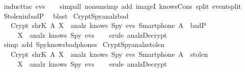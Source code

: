 \begin{isabellebody}
  \ {\isacharparenleft}induct{\isacharunderscore}tac\ {\isachardoublequoteopen}evs{\isachardoublequoteclose}{\isacharparenright}\isanewline
  \ \ \isamarkupfalse%
  \ {\isacharparenleft}simp{\isacharunderscore}all\ {\isacharparenleft}no{\isacharunderscore}asm{\isacharunderscore}simp{\isacharparenright}\ add{\isacharcolon}\ imageI\ knows{\isacharunderscore}Cons\ split{\isacharcolon}\ event{\isachardot}split{\isacharparenright}\isanewline
  \isamarkupfalse%
  \ Stolen{\isacharunderscore}in{\isacharunderscore}badP\ \isamarkupfalse%
  \ blast%
  \endisatagproof
  {\isafoldproof}%
  \isadelimproof
  \isanewline
  \endisadelimproof
  \isanewline
  \isanewline
  \isamarkupfalse%
  \ Crypt{\isacharunderscore}Spy{\isacharunderscore}analz{\isacharunderscore}bad\ {\isacharcolon}\isanewline
  \ \ {\isachardoublequoteopen}{\isasymlbrakk}\ Crypt\ {\isacharparenleft}shrK\ A{\isacharparenright}\ X\ {\isasymin}\ analz\ {\isacharparenleft}knows\ Spy\ evs{\isacharparenright}{\isacharsemicolon}\ Smartphone\ A\ {\isasymin}\ badP\ {\isasymrbrakk}\ \isanewline
  \ \ \ \ {\isasymLongrightarrow}\ X\ {\isasymin}\ analz\ {\isacharparenleft}knows\ Spy\ evs{\isacharparenright}{\isachardoublequoteclose}\isanewline
  \isadelimproof
  \isanewline
  \ \ %
  \endisadelimproof
  \isatagproof
  \isamarkupfalse%
  \ {\isacharparenleft}erule\ analz{\isachardot}Decrypt{\isacharparenright}\isanewline
  \ \ \isamarkupfalse%
  \ {\isacharparenleft}simp\ add{\isacharcolon}\ Spy{\isacharunderscore}knows{\isacharunderscore}bad{\isacharunderscore}phones{\isacharparenright}\isanewline
  \isamarkupfalse%
  \endisatagproof
  {\isafoldproof}%
  \isadelimproof
  \isanewline
  \endisadelimproof
  \isanewline
  \isamarkupfalse%
  \ Crypt{\isacharunderscore}Spy{\isacharunderscore}analz{\isacharunderscore}stolen\ {\isacharcolon}\ \isanewline
  \ \ {\isachardoublequoteopen}{\isasymlbrakk}\ Crypt\ {\isacharparenleft}shrK\ A{\isacharparenright}\ X\ {\isasymin}\ analz\ {\isacharparenleft}knows\ Spy\ evs{\isacharparenright}{\isacharsemicolon}\ Smartphone\ A\ {\isasymin}\ stolen\ {\isasymrbrakk}\ \isanewline
  \ \ \ \ {\isasymLongrightarrow}\ X\ {\isasymin}\ analz\ {\isacharparenleft}knows\ Spy\ evs{\isacharparenright}{\isachardoublequoteclose}\isanewline
  \isadelimproof
  \isanewline
  \ \ %
  \endisadelimproof
  \isatagproof
  \isamarkupfalse%
  \ {\isacharparenleft}erule\ analz{\isachardot}Decrypt{\isacharparenright}\isanewline

\end{isabellebody}
